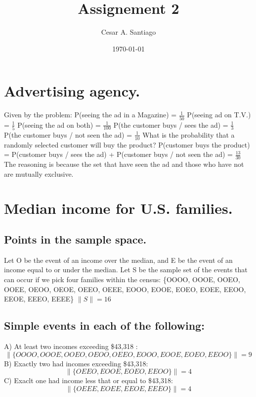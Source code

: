\documentclass[a4paper, 12pt]{article}
\begin{document}
\title{Assignement 2}
\author{Cesar A. Santiago}
\date{\today}
\maketitle

\tableofcontents
\newpage
{}

\section{Advertising agency.}
Given by the problem:\newline
P(seeing the ad in a Magazine) = $\frac{1}{50}$\newline
P(seeing ad on T.V.) = $\frac{1}{5}$\newline
P(seeing the ad on both) = $\frac{1}{100}$\newline
P(the customer buys / sees the ad) = $\frac{1}{3}$\newline
P(the customer buys / not seen the ad) = $\frac{1}{10}$\newline
What is the probability that a randomly selected customer will buy the product?\newline
P(customer buys the product) = P(customer buys / sees the ad) + P(customer buys / not seen the ad) = $\frac{13}{30}$\newline
The reasoning is because the set that have seen the ad and those who have not are mutually exclusive.
\section{Median income for U.S. families.}
\subsection{Points in the sample space.}
Let O be the event of an income over the median, and E be the event of an income equal to or under the median.\newline
Let S be the sample set of the events that can occur if we pick four families within the census: \{OOOO, OOOE, OOEO, OOEE, OEOO, OEOE, OEEO, OEEE, EOOO, EOOE, EOEO, EOEE, EEOO, EEOE, EEEO, EEEE\}\newline
$\|S\| = 16$
\subsection{Simple events in each of the following:}
A) At least two incomes exceeding \$43,318 : $$\|\{OOOO, OOOE, OOEO, OEOO, OEEO, EOOO, EOOE, EOEO, EEOO\}\| = 9$$
B) Exactly two had incomes exceeding \$43,318: $$\|\{OEEO, EOOE, EOEO, EEOO\}\| = 4$$
C) Exaclt one had income less that or equal to \$43,318: $$\|\{OEEE, EOEE, EEOE, EEEO\}\| = 4$$
\end{document}
